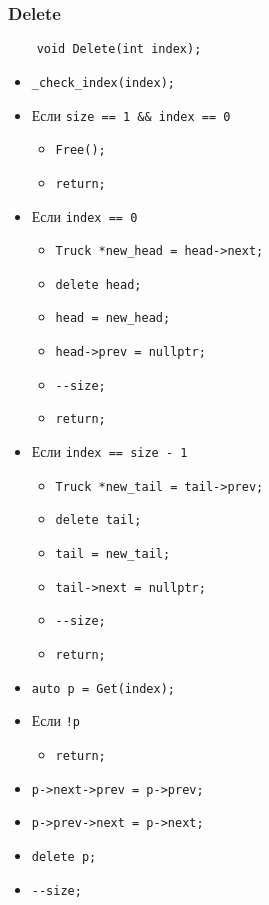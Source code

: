 \subsubsection*{Delete}

\begin{lstlisting}
    void Delete(int index);
\end{lstlisting}

\begin{itemize}
    \item \verb|_check_index(index);|
    \item Если \verb|size == 1 && index == 0|
        \begin{itemize}
            \item \verb|Free();|
            \item \verb|return;|
        \end{itemize}
    \item Если \verb|index == 0|
        \begin{itemize}
            \item \verb|Truck *new_head = head->next;|
            \item \verb|delete head;|
            \item \verb|head = new_head;|
            \item \verb|head->prev = nullptr;|
            \item \verb|--size;|
            \item \verb|return;|
        \end{itemize}
    \item Если \verb|index == size - 1|
        \begin{itemize}
            \item \verb|Truck *new_tail = tail->prev;|
            \item \verb|delete tail;|
            \item \verb|tail = new_tail;|
            \item \verb|tail->next = nullptr;|
            \item \verb|--size;|
            \item \verb|return;|
        \end{itemize}
    \item \verb|auto p = Get(index);|
    \item Если \verb|!p|
        \begin{itemize}
            \item \verb|return;|
        \end{itemize}
    \item \verb|p->next->prev = p->prev;|
    \item \verb|p->prev->next = p->next;|
    \item \verb|delete p;|
    \item \verb|--size;|
\end{itemize}


